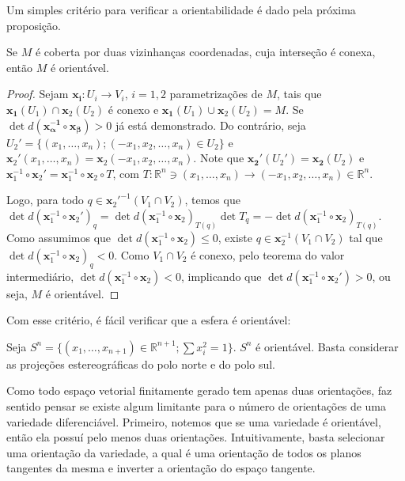 	Um simples critério para verificar a orientabilidade é dado pela próxima proposição.
	\begin{proposition}
		\label{prop:orientabilidade-duas-vizinhancas}
		Se $M$ é coberta por duas vizinhanças coordenadas, cuja interseção é conexa, então $M$ é orientável.
		\begin{proof}

			Sejam $\mathbf{x_{i}}:U_{i}\to V_{i}$, $i=1, 2$ parametrizações de $M$, tais que $\mathbf{x_{1}}(U_{1})\cap \mathbf{x}_{2}(U_{2})$ é conexo e $\mathbf{x_{1}}(U_{1})\cup \mathbf{x}_{2}(U_{2})=M$.
			Se $\det d(\mathbf{x_{\alpha}^{-1} \circ x_{\beta}})>0$ já está demonstrado. Do contrário, seja $U_{2}'=\{ (x_{1}, \dots, x_{n});(-x_{1}, x_{2}, \dots, x_{n})\in U_{2} \}$ e $\mathbf{x}_{2}'(x_{1}, \dots, x_{n})=\mathbf{x}_{2}(-x_{1}, x_{2}, \dots, x_{n})$.
			Note que $\mathbf{x_{2}'}(U_{2}')=\mathbf{x_{2}}(U_{2})$ e $\mathbf{x}_{1}^{-1} \circ \mathbf{x}_{2}'=\mathbf{x}_{1}^{-1}\circ \mathbf{x}_{2} \circ T$, com $T:\mathbb{R}^{n} \ni (x_{1}, \dots, x_{n}) \to (-x_{1}, x_{2}, \dots, x_{n}) \in \mathbb{R}^{n}$.

			Logo, para todo $q \in \mathbf{x}_{2}'^{-1}(V_{1}\cap V_{2})$, temos que $\det d(\mathbf{x}_{1}^{-1} \circ\mathbf{x}_{2}')_{q}=\det d(\mathbf{x}_{1}^{-1}\circ\mathbf{x}_{2})_{T(q)} \det T_{q}=-\det d(\mathbf{x}_{1}^{-1}\circ\mathbf{x}_{2})_{T(q)}$.
			Como assumimos que $\det d(\mathbf{x}_{1}^{-1}\circ\mathbf{x}_{2}) \leq0$, existe $q \in \mathbf{x}_{2}^{-1}(V_{1} \cap V_{2})$ tal que $\det d(\mathbf{x}_{1}^{-1}\circ\mathbf{x}_{2})_{q}<0$. Como $V_{1}\cap V_{2}$ é conexo, pelo teorema do valor intermediário, $\det d(\mathbf{x}_{1}^{-1}\circ\mathbf{x}_{2})<0$, implicando que $\det d(\mathbf{x}_{1}^{-1}\circ\mathbf{x}_{2}')>0$, ou seja, $M$ é orientável.
		\end{proof}
	\end{proposition}
	Com esse critério, é fácil verificar que a esfera é orientável:
	\begin{proposition}
		\label{prop:esfera-orientavel}
		Seja $S^{n}=\{ \left( x_{1}, \dots, x_{n+1}\right)\in \mathbb{R}^{n+1};\sum x_{i}^{2}=1 \}$. $S^{n}$ é orientável. Basta considerar as projeções estereográficas do polo norte e do polo sul.
	\end{proposition}
	Como todo espaço vetorial finitamente gerado tem apenas duas orientações, faz sentido pensar se existe algum limitante para o número de orientações de uma variedade diferenciável. Primeiro, notemos que se uma variedade é orientável, então ela possuí pelo menos duas orientações. Intuitivamente, basta selecionar uma orientação da variedade, a qual é uma orientação de todos os planos tangentes da mesma e inverter a orientação do espaço tangente.

